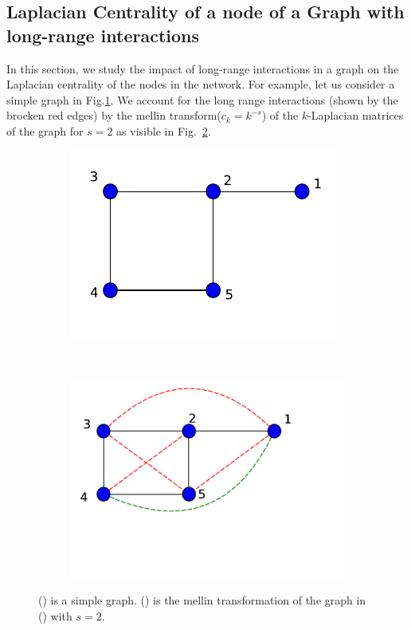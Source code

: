 \documentclass[10pt,a4paper]{article}
\begin{document}
\subsection{Laplacian Centrality of a node of a Graph with long-range interactions}
In this section, we study the impact of long-range interactions in a graph on the Laplacian centrality of the nodes in the network. For example, let us consider a simple graph in Fig.\ref{toymodel}. We account for the long range interactions (shown by the brocken red edges) by the mellin transform($c_k = k^{-s}$) of the $k$-Laplacian matrices of the graph for $s=2$ as  visible in Fig.~\ref{graph-longrange}.

\begin{figure}[H]
	\centering
	\begin{subfigure}[b]{0.3\textwidth}
		\includegraphics[width=\textwidth]{images/kenel-toymodel.pdf}
		\caption{}
		\label{toymodel}
	\end{subfigure}~
	\begin{subfigure}[b]{0.3\textwidth}
		\includegraphics[width= \textwidth]{images/graph-longrange-demo.pdf}
		\caption{}
		\label{graph-longrange}
	\end{subfigure}
	\caption{() is a simple graph. () is the mellin transformation of the graph in () with $s=2$.   }
	\label{}
\end{figure}
\end{document}

